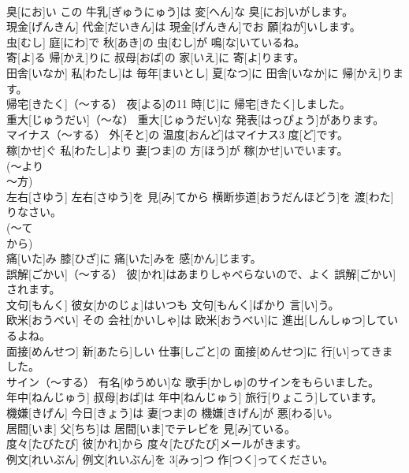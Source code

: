 \documentclass[8pt]{extreport}
\begin{document}
\begin{CJK}{UTF8}{min}
\\	臭[にお]い	この 牛乳[ぎゅうにゅう]は 変[へん]な 臭[にお]いがします。		
\\	現金[げんきん]	代金[だいきん]は 現金[げんきん]でお 願[ねが]いします。		
\\	虫[むし]	庭[にわ]で 秋[あき]の 虫[むし]が 鳴[な]いているね。		
\\	寄[よ]る	帰[かえ]りに 叔母[おば]の 家[いえ]に 寄[よ]ります。		
\\	田舎[いなか]	私[わたし]は 毎年[まいとし] 夏[なつ]に 田舎[いなか]に 帰[かえ]ります。		
\\	帰宅[きたく]（～する）	夜[よる]の11 時[じ]に 帰宅[きたく]しました。		
\\	重大[じゅうだい]（～な）	重大[じゅうだい]な 発表[はっぴょう]があります。		
\\	マイナス（～する）	外[そと]の 温度[おんど]はマイナス3 度[ど]です。		
\\	稼[かせ]ぐ	私[わたし]より 妻[つま]の 方[ほう]が 稼[かせ]いでいます。		
\\	(～より
\\	～方) 
\\	左右[さゆう]	左右[さゆう]を 見[み]てから 横断歩道[おうだんほどう]を 渡[わた]りなさい。		
\\	(～て
\\	から) 
\\	痛[いた]み	膝[ひざ]に 痛[いた]みを 感[かん]じます。		
\\	誤解[ごかい]（～する）	彼[かれ]はあまりしゃべらないので、よく 誤解[ごかい]されます。		
\\	文句[もんく]	彼女[かのじょ]はいつも 文句[もんく]ばかり 言[い]う。		
\\	欧米[おうべい]	その 会社[かいしゃ]は 欧米[おうべい]に 進出[しんしゅつ]しているよね。		
\\	面接[めんせつ]	新[あたら]しい 仕事[しごと]の 面接[めんせつ]に 行[い]ってきました。		
\\	サイン（～する）	有名[ゆうめい]な 歌手[かしゅ]のサインをもらいました。		
\\	年中[ねんじゅう]	叔母[おば]は 年中[ねんじゅう] 旅行[りょこう]しています。		
\\	機嫌[きげん]	今日[きょう]は 妻[つま]の 機嫌[きげん]が 悪[わる]い。		
\\	居間[いま]	父[ちち]は 居間[いま]でテレビを 見[み]ている。		
\\	度々[たびたび]	彼[かれ]から 度々[たびたび]メールがきます。		
\\	例文[れいぶん]	例文[れいぶん]を 3[みっ]つ 作[つく]ってください。		

\end{CJK}
\end{document}
